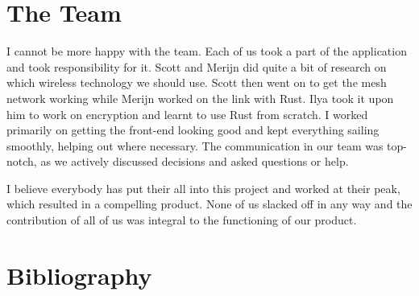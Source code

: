 \documentclass{jatex-article}
\begin{document}
\section*{The Team}

I cannot be more happy with the team. Each of us took a part of the application
and took responsibility for it. Scott and Merijn did quite a bit of research on
which wireless technology we should use. Scott then went on to get the mesh
network working while Merijn worked on the link with Rust. Ilya took it upon
him to work on encryption and learnt to use Rust from scratch. I worked
primarily on getting the front-end looking good and kept everything sailing
smoothly, helping out where necessary. The communication in our team was
top-notch, as we actively discussed decisions and asked questions or help.

I believe everybody has put their all into this project and worked at their
peak, which resulted in a compelling product. None of us slacked off in any way
and the contribution of all of us was integral to the functioning of our
product.

\section*{Bibliography}

\nocite{*}
\printbibliography[heading=none]
\end{document}
